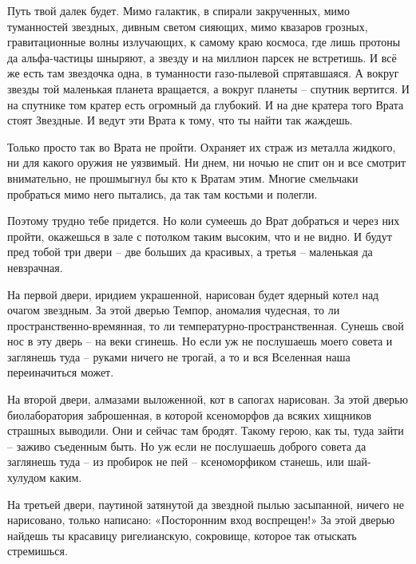 \documentclass[ebook,oneside,final,openright]{memoir}
\begin{document}
\par
Путь твой далек будет. Мимо галактик, в спирали закрученных, мимо туманностей звездных, дивным светом сияющих, мимо квазаров грозных, гравитационные волны излучающих, к самому краю космоса, где лишь протоны да альфа-частицы шныряют, а звезду и на миллион парсек не встретишь. И всё же есть там звездочка одна, в туманности газо-пылевой спрятавшаяся. А вокруг звезды той маленькая планета вращается, а вокруг планеты – спутник вертится. И на спутнике том кратер есть огромный да глубокий. И на дне кратера того Врата стоят Звездные. И ведут эти Врата к тому, что ты найти так жаждешь.\par
\par
Только просто так во Врата не пройти. Охраняет их страж из металла жидкого, ни для какого оружия не уязвимый. Ни днем, ни ночью не спит он и все смотрит внимательно, не прошмыгнул бы кто к Вратам этим. Многие смельчаки пробраться мимо него пытались, да так там костьми и полегли.\par
\par
Поэтому трудно тебе придется. Но коли сумеешь до Врат добраться и через них пройти, окажешься в зале с потолком таким высоким, что и не видно. И будут пред тобой три двери – две больших да красивых, а третья – маленькая да невзрачная.\par
\par
На первой двери, иридием украшенной, нарисован будет ядерный котел над очагом звездным. За этой дверью Темпор, аномалия чудесная, то ли пространственно-времянная, то ли температурно-пространственная. Сунешь свой нос в эту дверь – на веки сгинешь. Но если уж не послушаешь моего совета и заглянешь туда – руками ничего не трогай, а то и вся Вселенная наша переиначиться может.\par
\par
На второй двери, алмазами выложенной, кот в сапогах нарисован. За этой дверью биолаборатория заброшенная, в которой ксеноморфов да всяких хищников страшных выводили. Они и сейчас там бродят. Такому герою, как ты, туда зайти – заживо съеденным быть. Но уж если не послушаешь доброго совета да заглянешь туда – из пробирок не пей – ксеноморфиком станешь, или шай-хулудом каким.\par
\par
На третьей двери, паутиной затянутой да звездной пылью засыпанной, ничего не нарисовано, только написано: «Посторонним вход воспрещен!» За этой дверью найдешь ты красавицу ригелианскую, сокровище, которое так отыскать стремишься.\par
\end{document}
